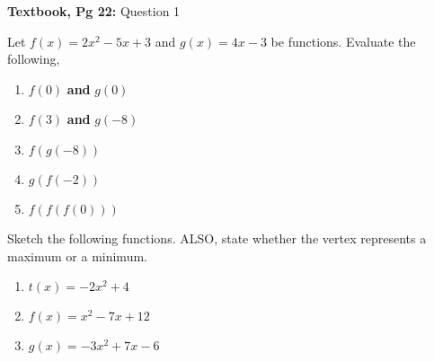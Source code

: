 \documentclass[12pt]{article} %
\begin{document}
\begin{qstn}
  \textbf{Textbook, Pg 22:} Question 1
\end{qstn}

\newpage

\begin{qstn}
  Let $f(x) = 2x^2 - 5x + 3$ and $g(x) = 4x - 3$ be functions. Evaluate the following,
  \begin{enumerate}[label=(\alph*)]
    \item $f(0)$ \textbf{and} $g(0)$
    \item $f(3)$ \textbf{and} $g(-8)$
    \item $f(g(-8))$
    \item $g(f(-2))$
    \item $f(f(f(0)))$
  \end{enumerate}
  
\end{qstn}

\begin{qstn}
  Sketch the following functions. ALSO, state whether the vertex represents a maximum or a minimum.
  \begin{enumerate}[label=(\alph*)]
    \item $t(x) = -2x^2 + 4$
    \item $f(x) = x^2 - 7x + 12$
    \item $g(x) = -3x^2 + 7x - 6$
  \end{enumerate}
\end{qstn}
\end{document}
